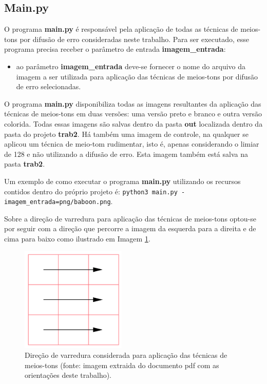 \documentclass{article}
\begin{document}
%
\subsection{Main.py}
O programa \textbf{main.py} é responsável pela aplicação de todas as técnicas de meios-tons por difusão de erro consideradas neste trabalho. Para ser executado, esse programa precisa receber o parâmetro de entrada \textbf{imagem\_entrada}:

\begin{itemize}
	\item ao parâmetro \textbf{imagem\_entrada} deve-se fornecer o nome do arquivo da imagem a ser utilizada para aplicação das técnicas de meios-tons por difusão de erro selecionadas.
\end{itemize}
	
\noindent

O programa \textbf{main.py} disponibiliza todas as imagens resultantes da aplicação das técnicas de meios-tons em duas versões: uma versão preto e branco e outra versão colorida. Todas essas imagens são salvas dentro da pasta \textbf{out} localizada dentro da pasta do projeto \textbf{trab2}. Há também uma imagem de controle, na qualquer se aplicou um técnica de meio-tom rudimentar, isto é, apenas considerando o limiar de 128 e não utilizando a difusão de erro. Esta imagem também está salva na pasta \textbf{trab2}.

Um exemplo de como executar o programa \textbf{main.py} utilizando os recursos contidos dentro do próprio projeto é: \lstinline{python3 main.py -imagem_entrada=png/baboon.png}.

Sobre a direção de varredura para aplicação das técnicas de meios-tons optou-se por seguir com a direção que percorre a imagem da esquerda para a direita e de cima para baixo como ilustrado em Imagem \ref{fig:direcao_varredura}.

\begin{figure}[htp]%
	\centering
	\includegraphics[width=5cm]{./varredura.png} %
	\caption{Direção de varredura considerada para aplicação das técnicas de meios-tons (fonte: imagem extraida do documento pdf com as orientações deste trabalho).}%
	\label{fig:direcao_varredura}%
\end{figure}
\end{document}

